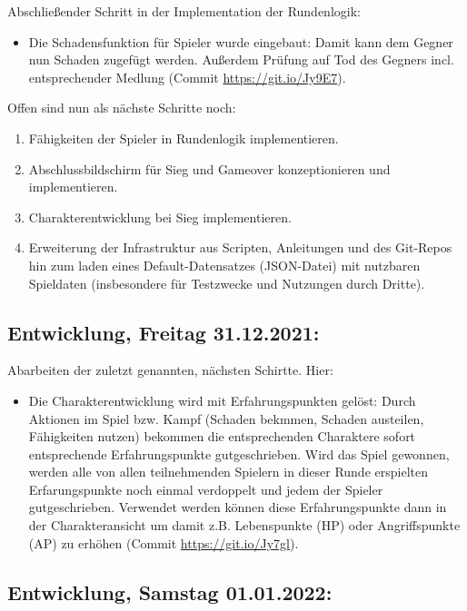 Abschließender Schritt in der Implementation der Rundenlogik:

\begin{itemize}
    \item Die Schadensfunktion für Spieler wurde eingebaut: Damit kann dem Gegner nun Schaden zugefügt werden. Außerdem Prüfung auf Tod des Gegners incl. entsprechender Medlung (Commit \url{https://git.io/Jy9E7}).
\end{itemize}

Offen sind nun als nächste Schritte noch:
\begin{enumerate}
    \item Fähigkeiten der Spieler in Rundenlogik implementieren.
    \item Abschlussbildschirm für Sieg und Gameover konzeptionieren und implementieren. 
    \item Charakterentwicklung bei Sieg implementieren.
    \item Erweiterung der Infrastruktur aus Scripten, Anleitungen und des Git-Repos hin zum laden eines Default-Datensatzes (JSON-Datei) mit nutzbaren Spieldaten (insbesondere für Testzwecke und Nutzungen durch Dritte).
\end{enumerate}


\subsection{Entwicklung, Freitag 31.12.2021:}

Abarbeiten der zuletzt genannten, nächsten Schirtte. Hier: 

\begin{itemize}
    \item Die Charakterentwicklung wird mit Erfahrungspunkten gelöst: Durch Aktionen im Spiel bzw. Kampf (Schaden bekmmen, Schaden austeilen, Fähigkeiten nutzen) bekommen die entsprechenden Charaktere sofort entsprechende Erfahrungspunkte gutgeschrieben. Wird das Spiel gewonnen, werden alle von allen teilnehmenden Spielern in dieser Runde erspielten Erfarungspunkte noch einmal verdoppelt und jedem der Spieler gutgeschrieben. Verwendet werden können diese Erfahrungspunkte dann in der Charakteransicht um damit z.B. Lebenspunkte (HP) oder Angriffspunkte (AP) zu erhöhen (Commit \url{https://git.io/Jy7gl}).
\end{itemize}


\subsection{Entwicklung, Samstag 01.01.2022:}

